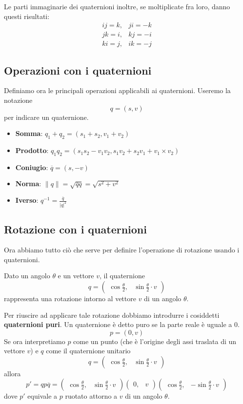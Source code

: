 Le parti immaginarie dei quaternioni inoltre, se moltiplicate fra loro, danno questi risultati:
\[
	\begin{array}{lr}
		ij = k, & ji = -k \\
		jk = i, & kj = -i \\
		ki = j, & ik = -j
	\end{array}
\]
\subsection{Operazioni con i quaternioni}
Definiamo ora le principali operazioni applicabili ai quaternioni. Useremo la notazione
\[ q = (s, v) \]
per indicare un quaternione.
\begin{itemize}
	\item \textbf{Somma}: $q_1 + q_2 = (s_1 + s_2, v_1 + v_2)$
	\item \textbf{Prodotto}: $q_1 q_2 = (s_1 s_2 - v_1 v_2, s_1 v_2 + s_2 v_1 + v_1 \times v_2)$
	\item \textbf{Coniugio}: $\overline{q} = (s, -v)$
	\item \textbf{Norma}: $\| q \| = \sqrt{\overline{q} q} = \sqrt{s^2 + v^2}$
	\item \textbf{Iverso}: $q^{-1} = \displaystyle\frac{\overline{q}}{|q|^2}$
\end{itemize}

\subsection{Rotazione con i quaternioni}
Ora abbiamo tutto ci\`o che serve per definire l'operazione di rotazione usando i quaternioni.

Dato un angolo $\theta$ e un vettore $v$, il quaternione
\[
	q = \begin{pmatrix} \cos{\displaystyle\frac{\theta}{2}},
		 & \sin{\displaystyle\frac{\theta}{2} \cdot v}\end{pmatrix}
\]
rappresenta una rotazione intorno al vettore $v$ di un angolo $\theta$.

Per riuscire ad applicare tale rotazione dobbiamo introdurre i cosiddetti \textbf{quaternioni puri}. Un quaternione \`e
detto puro se la parte reale \`e uguale a 0.
\[ p = (0, v) \]
Se ora interpretiamo $p$ come un punto (che \`e l'origine degli assi traslata di un vettore $v$) e $q$ come il quaternione
unitario
\[
	q = \begin{pmatrix}
		\cos{\displaystyle\frac{\theta}{2}},
		 & \sin{\displaystyle\frac{\theta}{2} \cdot v}
	\end{pmatrix}
\]
allora
\[
	p' = q p \overline{q} =
	\begin{pmatrix}
		\cos{\displaystyle\frac{\theta}{2}}, & \sin{\displaystyle\frac{\theta}{2} \cdot v}
	\end{pmatrix}
	\begin{pmatrix}
		0, & v
	\end{pmatrix}
	\begin{pmatrix}
		\cos{\displaystyle\frac{\theta}{2}}, & -\sin{\displaystyle\frac{\theta}{2} \cdot v}
	\end{pmatrix}
\]
dove $p'$ equivale a $p$ ruotato attorno a $v$ di un angolo $\theta$.

